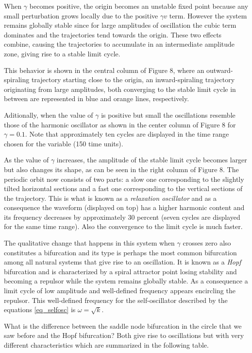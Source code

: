 \documentclass{article}
\begin{document}
When $\gamma$ becomes positive, the origin becomes an unstable fixed point because any small perturbation grows locally due to the positive $\gamma v$ term. 
However the system remains globally stable since for large amplitudes of oscillation the cubic term dominates and the trajectories tend towards the origin. 
These two effects combine, causing the trajectories to accumulate in an intermediate amplitude zone, giving rise to a stable limit cycle. 

This behavior is shown in the central column of Figure 8, where an outward-spiraling trajectory starting close to the origin, an inward-spiraling trajectory originating from large amplitudes, both converging to the stable limit cycle in between are represented in blue and orange lines, respectively.
 
Aditionally, when the value of $\gamma$ is positive but small the oscillations resemble those of the harmonic oscillator as shown in the center column of Figure 8 for $\gamma=0.1$. 
Note that approximately ten cycles are displayed in the time range chosen for the variable (150 time units).

As the value of $\gamma$ increases, the amplitude of the stable limit cycle becomes larger but also changes its shape, as can be seen in the right column of Figure 8. 
The periodic orbit now consists of two parts: a slow one corresponding to the slightly tilted horizontal sections and a fast one corresponding to the vertical sections of the trajectory. 
This is what is known as a {\em relaxation oscillator} and as a consequence the waveform (displayed on top) has a higher harmonic content and its frequency decreases by approximately 30 percent (seven cycles are displayed for the same time range). Also the convergence to the limit cycle is much faster.

The qualitative change that happens in this system when $\gamma$ crosses zero also constitutes a bifurcation and its type is perhaps the most common bifurcation among all natural systems that give rise to an oscillation. 
It is known as a {\em Hopf} bifurcation and is characterized by a spiral attractor point losing stability and becoming a repulsor while the system remains globally stable. As a consequence a limit cycle of low amplitude and well-defined frequency appears encircling the repulsor. This well-defined frequency for the self-oscillator described by the equations \ref{eq_selfosc} is $\omega=\sqrt{k}$.

What is the difference between the saddle node bifurcation in the circle that we saw before and the Hopf bifurcation? 
Both give rise to oscillations but with very different characteristics which are summarized in the following table.
\end{document}
